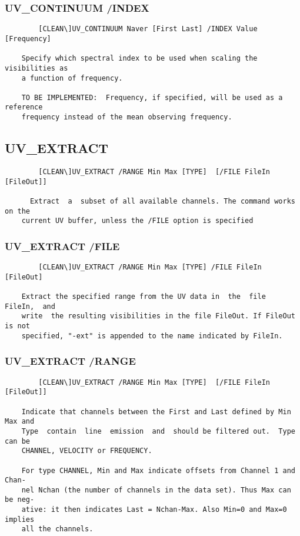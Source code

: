 \subsubsection{UV\_CONTINUUM /INDEX}
\begin{verbatim}
        [CLEAN\]UV_CONTINUUM Naver [First Last] /INDEX Value [Frequency]

    Specify which spectral index to be used when scaling the visibilities as
    a function of frequency.

    TO BE IMPLEMENTED:  Frequency, if specified, will be used as a reference
    frequency instead of the mean observing frequency.

\end{verbatim}
\subsection{UV\_EXTRACT}
\begin{verbatim}
        [CLEAN\]UV_EXTRACT /RANGE Min Max [TYPE]  [/FILE FileIn [FileOut]]

      Extract  a  subset of all available channels. The command works on the
    current UV buffer, unless the /FILE option is specified

\end{verbatim}
\subsubsection{UV\_EXTRACT /FILE}
\begin{verbatim}
        [CLEAN\]UV_EXTRACT /RANGE Min Max [TYPE] /FILE FileIn [FileOut]

    Extract the specified range from the UV data in  the  file  FileIn,  and
    write  the resulting visibilities in the file FileOut. If FileOut is not
    specified, "-ext" is appended to the name indicated by FileIn.

\end{verbatim}
\subsubsection{UV\_EXTRACT /RANGE}
\begin{verbatim}
        [CLEAN\]UV_EXTRACT /RANGE Min Max [TYPE]  [/FILE FileIn [FileOut]]

    Indicate that channels between the First and Last defined by Min Max and
    Type  contain  line  emission  and  should be filtered out.  Type can be
    CHANNEL, VELOCITY or FREQUENCY.

    For type CHANNEL, Min and Max indicate offsets from Channel 1 and  Chan-
    nel Nchan (the number of channels in the data set). Thus Max can be neg-
    ative: it then indicates Last = Nchan-Max. Also Min=0 and Max=0  implies
    all the channels.

\end{verbatim}

